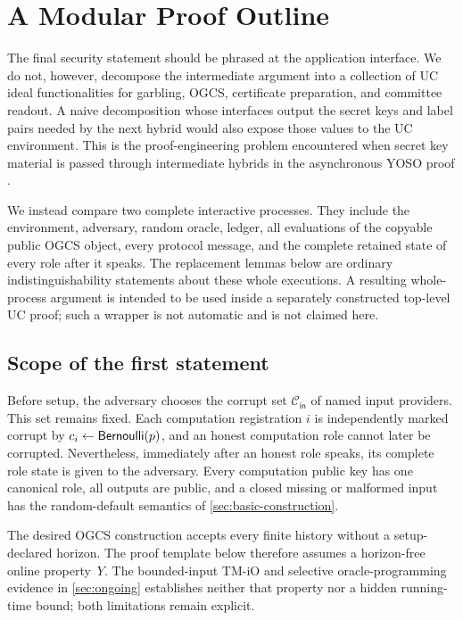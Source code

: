 \section{A Modular Proof Outline}
\label{sec:proof-outline}

The final security statement should be phrased at the application interface.
We do not, however, decompose the intermediate argument into a collection of
UC ideal functionalities for garbling, OGCS, certificate preparation, and
committee readout.  A naive decomposition whose interfaces output the secret
keys and label pairs needed by the next hybrid would also expose those values
to the UC environment.  This is the proof-engineering problem encountered
when secret key material is passed through intermediate hybrids in the
asynchronous YOSO proof \cite{DamgardEtAl2025AsyncYOSO}.

We instead compare two complete interactive processes.  They include the
environment, adversary, random oracle, ledger, all evaluations of the copyable
public OGCS object, every protocol message, and the complete retained state of
every role after it speaks.  The replacement lemmas below are ordinary
indistinguishability statements about these whole executions.  A resulting
whole-process argument is intended to be used inside a separately constructed
top-level UC proof; such a wrapper is not automatic and is not claimed here.

\subsection{Scope of the first statement}

Before setup, the adversary chooses the corrupt set
$\mathcal C_{\mathsf{in}}$ of named input providers.  This set remains fixed.
Each computation registration $i$ is independently marked corrupt by
$c_i\mathrel{\leftarrow}\mathsf{Bernoulli}(p)$, and an honest computation role cannot later
be corrupted.  Nevertheless, immediately after an honest role speaks, its
complete role state is given to the adversary.  Every computation public key
has one canonical role, all outputs are public, and a closed missing or
malformed input has the random-default semantics of
\cref{sec:basic-construction}.

The desired OGCS construction accepts every finite history without a
setup-declared horizon.  The proof template below therefore assumes a
horizon-free online property~$Y$.  The bounded-input TM-iO and selective
oracle-programming evidence in \cref{sec:ongoing} establishes neither that
property nor a hidden running-time bound; both limitations remain explicit.

